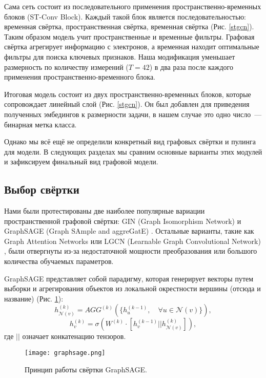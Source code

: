 \documentclass[12pt]{article}
\begin{document}
Сама сеть состоит из последовательного применения пространственно-временных блоков (ST-Conv Block). Каждый такой блок является последовательностью: временная свёртка, пространственная свёртка, временная свёртка (Рис. \ref{stgcn}). Таким образом модель учит пространственные и временные фильтры. Графовая свёртка агрегирует информацию с электронов, а временная находит оптимальные фильтры для поиска ключевых признаков. Наша модификация уменьшает размерность по количеству измерений ($T=42$) в два раза после каждого применения пространственно-временного блока.

Итоговая модель состоит из двух пространственно-временных блоков, которые сопровождает линейный слой (Рис. \ref{stgcn}). Он был добавлен для приведения полученных эмбедингов к размерности задачи, в нашем случае это одно число~--- бинарная метка класса.

Однако мы всё ещё не определили конкретный вид графовых свёртки и пулинга для модели. В следующих разделах мы сравним основные варианты этих модулей и зафиксируем финальный вид графовой модели.

\subsection{Выбор свёртки}

Нами были протестированы две наиболее популярные вариации пространственной графовой свёртки: GIN (Graph Isomorphism Network) \cite{xu2018powerful} и GraphSAGE (Graph SAmple and aggreGatE) \cite{hamilton2017inductive}. Остальные варианты, такие как Graph Attention Networks \cite{velivckovic2017graph} или LGCN (Learnable Graph Convolutional Network) \cite{gao2018large}, были отвергнуты из-за недостаточной мощности преобразования или большого количества обучаемых параметров.

GraphSAGE представляет собой парадигму, которая генерирует векторы путем выборки и агрегирования объектов из локальной окрестности вершины (отсюда и название) (Рис. \ref{graphsage}):
$$
h_{\mathcal{N}(v)}^{(k)} = AGG^{(k)}(\{h_u^{(k-1)} , \quad \forall u \in \mathcal{N}(v)\}),
$$
$$
h_{v}^{(k)} = \sigma(W^{(k)} \cdot [h_{v}^{(k-1)}||h_{\mathcal{N}(v)}^{(k)}]),
$$
где $||$ означает конкатенацию тензоров.

\begin{figure}[ht]
        \centering
        \texttt{[image: graphsage.png]}
        \caption{Принцип работы свёртки GraphSAGE.}
        \label{graphsage}
    \end{figure}
\end{document}
